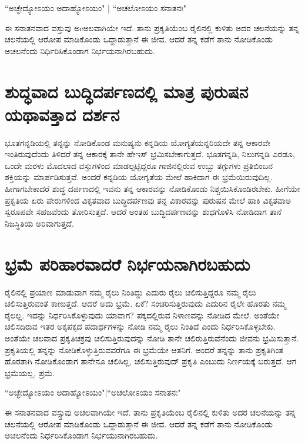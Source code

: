 \begin{shloka}
``ಅಚ್ಛೇದ್ಯೋಽಯಂ ಅದಾಹ್ಯೋಽಯಂ" | ``ಅಚಲೋಽಯಂ ಸನಾತನಃ"\label{36}
\end{shloka}

ಈ ಸನಾತನವಾದ ವಸ್ತುವು ಅcಅಲವಾಗಿಯೇ ಇದೆ. ತಾನು ಪ್ರಕೃತಿಯೆಂಬ ರೈಲಿನಲ್ಲಿ ಕುಳಿತು ಅದರ ಚಲನೆಯನ್ನು ತನ್ನ ಚಲನೆಯಲ್ಲಿ ಆರೋಪ ಮಾಡಿಕೊಂಡು ಒದ್ದಾಡುತ್ತಾನೆ ಈ ಜೀವ. ಆದರೆ ತನ್ನ ಕಡೆಗೆ ತಾನು ನೋಡಿಕೊಂಡು ಅಚಲನೆಂದು ನಿರ್ಧಿರಿಸಿಕೊಂಡಾಗ ನಿರ್ಭಯನಾಗಿರಬಹುದು.

\section*{ಶುದ್ಧವಾದ ಬುದ್ಧಿದರ್ಪಣದಲ್ಲಿ ಮಾತ್ರ ಪುರುಷನ ಯಥಾವತ್ತಾದ ದರ್ಶನ}

ಭೂತಗನ್ನಡಿಯಲ್ಲಿ  ತನ್ನನ್ನು ನೋಡಿಕೊಂಡ ಮನುಷ್ಯನು ಕನ್ನಡಿಯ ಯೋಗ್ಯತೆಯನ್ನರಿಯದೇ ತನ್ನ ಆಕಾರವೇ ಇಂತಿರುವುದೆಂದು ತಿಳಿದರೆ ತನ್ನ ಆಕಾರಕ್ಕೆ ತಾನೇ ಹೇಇಸ್ ಭ್ರಮಿಸಬೇಕಾಗುತ್ತದೆ. ಭೂತಗನ್ನಡಿ, ನಿಲುಗನ್ನಡಿ ಎರಡೂ, ಒಂದೇ ಮರಳು ಮೊದಲಾದ ವಸ್ತುಗಳಿಂದ ಮಾಡಲ್ಪಟ್ಟಿದ್ದರೂ ಗಾಜಿನಲ್ಲಿರುವ ಉಬ್ಬು ತಗ್ಗುಗಳು ಪ್ರತಿಬಿಂಬನ ಶಕ್ತಿಯನ್ನು ಮಾರ್ಪಡಿಸುತ್ತವೆ. ಅಂದರೆ ಕನ್ನಡಿಯ ಯೋಗ್ಯತೆಯ ಮೇಲೆ ಹಾಕಿದಾಗ ಈ ಭ್ರಮೆಯಿರುವುದಿಲ್ಲ. ಹೀಗಾಗಬೇಕಾದರೆ ಶುದ್ಧ ದರ್ಪಣದಲ್ಲಿ ಇವನು ತನ್ನ ಆಕಾರವನ್ನು ನೋಡಿಕೊಂಡು ನಿಶ್ಚಯಿಸಿಕೊಂಡಿರಬೇಕು. ಹೀಗೆಯೇ ಪ್ರಕೃತಿಯ ಏರು ಪೇರುಗಳಿಂದ ವಿಕೃತವಾದ ಬುದ್ಧಿದರ್ಪಣವು ತನ್ನ ವಿಕಾರವನ್ನು ಪುರುಷನ ಮೇಲೆ ಹಾಕಿ ವಿಕೃತವಾಅ ಸ್ವರೂಪವೇ ಸಹಜವೆಂದು ತೋರಿಸುತ್ತದೆ. ಆದರೆ ಅಂತಹ ಬುದ್ಧಿದರ್ಪಣವನ್ನು ಶುಧಗೊಳಿಸಿ ನೋಡಿದಾಗ ತಾನೆ ನಿಜಸ್ಥಿತಿಯ ಅರಿವಾಗುತ್ತದೆ.

\section*{ಭ್ರಮೆ ಪರಿಹಾರವಾದರೆ ನಿರ್ಭಯನಾಗಿರಬಹುದು}

ರೈಲಿನಲ್ಲಿ ಪ್ರಯಾಣ ಮಾಡುವಾಗ ನಮ್ಮ ರೈಲು ನಿಂತಿದ್ದು ಎದುರು ರೈಲು ಚಲಿಸುತ್ತಿದ್ದರೂ ನಮ್ಮ ರೈಲು ಚಲಿಸುತ್ತಿರುವಂತೆ ಕಾಣುತ್ತದೆ. ಆದರೆ ಅದು ಭ್ರಮೆ. ಏಕೆ? ಸಂಚರಿಸುತ್ತಿರುವುದು ಎದುರಿನ ರೈಲೇ ಹೊರತು ನಮ್ಮ ರೈಲಲ್ಲ. ಇದನ್ನು ನಿರ್ಧರಿಸಿಕೊಳ್ಳುವುದು ಯಾವಾಗ? ಪಕ್ಕದಲ್ಲಿರುವ ನಿಳಾಣವನ್ನು ನೋಡಿದ ಮೇಲೆ. ಅಂತೆಯೇ ಚಲಿಸದಿರುವ ಇತರ ಅಕ್ಕಪಕ್ಕದ ಪದಾರ್ಥಗಳನ್ನು ನೋಡಿ ನಮ್ಮ ರೈಲು ನಿಂತಿದೆ ಎಂದು ನಿರ್ಧರಿಸಿಕೊಳ್ಳಬೇಕು. ಅಂತೆಯೇ ಚಲವಾದ ಪ್ರಕೃತಿಚಕ್ರವು ಚಲಿಸುತ್ತಿರುವುದನ್ನು ನೋಡಿ ತಾನೇ ಚಲಿರುತ್ತಿರುವೆನೆಂದು ಜೀವನು ಭ್ರಮಿಸುತ್ತಾನೆ. ಪ್ರಕೃತಿಯಲ್ಲಿ ತನ್ನನ್ನು ನೋಡಿಕೊಳ್ಳುತ್ತಿರುವವರೆಗೂ ಈ ಭ್ರಮೆಯೇ ಆತನಿಗೆ. ಅಂದರೆ ತನ್ನನ್ನು ತಾನು ಪ್ರಕೃತಿಗಿಂತ ಹೊರತಾಗಿ ನೋಡಿಕೊಂಡಾಗ ತಾನೇನೂ ಚಲಿಸಿಲ್ಲ, ಚಲಿಸುತ್ತಿರುವುದ್ ಪ್ರಕೃತಿ ಎಂಬುದು ನಿರ್ಣಯಕ್ಕೆ ಬರುತ್ತದೆ. ಆಗ ಭ್ರಮೆಯಲ್ಲ, ಪ್ರಮೆ.

\begin{shloka}
``ಅಚ್ಛೇದ್ಯೋಽಯಂ ಅದಾಹ್ಯೋಽಯಂ"|``ಅಚಲೋಽಯಂ ಸನಾತನಃ"
\end{shloka}

ಈ ಸನಾತನವಾದ ವಸ್ಸ್ತುವು ಅಚಲವಾಗಿಯೇ ಇದೆ. ತಾನು ಪ್ರಕೃತಿಯೆಂಬ ರೈಲಿನಲ್ಲಿ ಕುಳಿತು ಅದರ ಚಲನೆಯನ್ನು ತನ್ನ ಚಲನೆಯಲ್ಲಿ ಆರೋಪ ಮಾಡಿಕೊಂಡು ಒದ್ದಾಡುತ್ತಾನೆ ಈ ಜೀವ. ಆದರೆ ತನ್ನ ಕಡೆಗೆ ತಾನು ನೋಡಿಕೊಂಡು ಅಚಲನೆಂದು ನಿರ್ಧರಿಸಿಕೊಂಡಾಗ ನಿರ್ಭಯುನಾಗಿರಬಹುದು.

